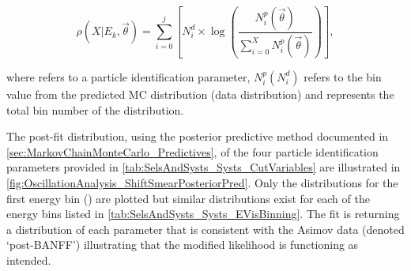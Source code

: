 \begin{equation}
\rho(X | E_k, \vec{\theta}) = \sum^{j}_{i = 0} \left[ N_i^d \times \log \left( \frac{N_i^p (\vec{\theta})}{\sum^{X}_{i = 0}N_i^p (\vec{\theta})} \right) \right],
\end{equation}

where  refers to a particle identification parameter, $N_{i}^{p}(N_{i}^{d})$ refers to the  bin value from the predicted MC distribution (data distribution) and  represents the total bin number of the  distribution.

The post-fit distribution, using the posterior predictive method documented in \autoref{sec:MarkovChainMonteCarlo_Predictives}, of the four particle identification parameters provided in \autoref{tab:SelsAndSysts_Systs_CutVariables} are illustrated in \autoref{fig:OscillationAnalysis_ShiftSmearPosteriorPred}. Only the distributions for the first energy bin () are plotted but similar distributions exist for each of the energy bins listed in \autoref{tab:SelsAndSysts_Systs_EVisBinning}. The fit is returning a distribution of each parameter that is consistent with the Asimov data (denoted `post-BANFF') illustrating that the modified likelihood is functioning as intended. 

